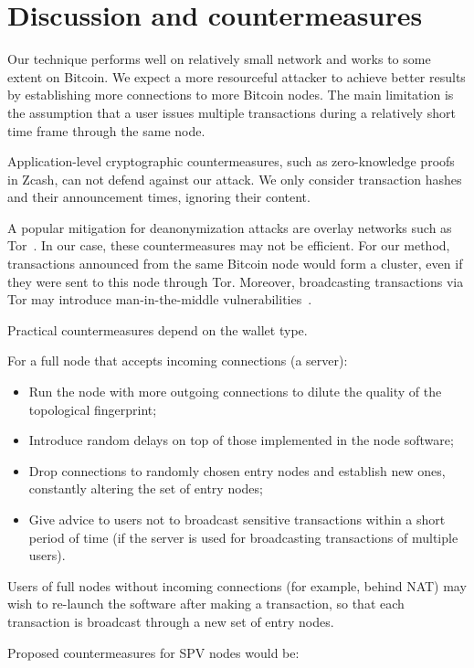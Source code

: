 \section{Discussion and countermeasures}

Our technique performs well on relatively small network and works to some extent on Bitcoin.
We expect a more resourceful attacker to achieve better results by establishing more connections to more Bitcoin nodes.
The main limitation is the assumption that a user issues multiple transactions during a relatively short time frame through the same node.

Application-level cryptographic countermeasures, such as zero-knowledge proofs in Zcash, can not defend against our attack.
We only consider transaction hashes and their announcement times, ignoring their content.

A popular mitigation for deanonymization attacks are overlay networks such as Tor~\cite{Tor}.
In our case, these countermeasures may not be efficient.
For our method, transactions announced from the same Bitcoin node would form a cluster, even if they were sent to this node through Tor.
Moreover, broadcasting transactions via Tor may introduce man-in-the-middle vulnerabilities~\cite{Biryukov2015}.

Practical countermeasures depend on the wallet type.

For a full node that accepts incoming connections (a server):

\begin{itemize}
	\item Run the node with more outgoing connections to dilute the quality of the topological fingerprint;
	\item Introduce random delays on top of those implemented in the node software;
	\item Drop connections to randomly chosen entry nodes and establish new ones, constantly altering the set of entry nodes;
	\item Give advice to users not to broadcast sensitive transactions within a short period of time (if the server is used for broadcasting transactions of multiple users).
\end{itemize}

Users of full nodes without incoming connections (for example, behind NAT) may wish to re-launch the software after making a transaction, so that each transaction is broadcast through a new set of entry nodes.

Proposed countermeasures for SPV nodes would be:

